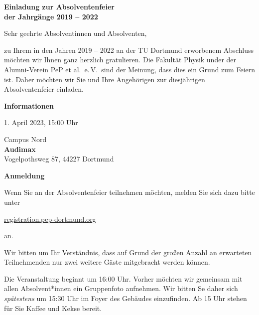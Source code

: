 \documentclass[parskip=half, fontsize=10pt, paper=a5]{scrartcl}
\begin{document}
\raggedright


\begin{center}
\textbf{\Large Einladung zur Absolventenfeier\\ der Jahrgänge 2019 – 2022}
\end{center}
\vspace{0.5cm}

Sehr geehrte Absolventinnen und Absolventen,

zu Ihrem in den Jahren 2019 – 2022 an der TU Dortmund erworbenem Abschluss möchten
wir Ihnen ganz herzlich gratulieren.
Die Fakultät Physik under der Alumni-Verein PeP et al.\ e.\,V.\ sind der Meinung, dass dies ein Grund zum Feiern ist.
Daher möchten wir Sie und Ihre Angehörigen zur diesjährigen Absolventenfeier einladen.

\vspace{0.25cm}
\textcolor{tu}{\textbf{\large Informationen}}
\begin{description}[style=multiline, leftmargin=5em]
  \item[Wann] 1. April 2023, 15:00 Uhr
  \item[Wo] Campus Nord\\
    \textbf{Audimax}\\
    Vogelpothsweg 87, 44227 Dortmund
\end{description}

\vspace{0.25cm}
\textcolor{tu}{\textbf{\large Anmeldung}}

Wenn Sie an der Absolventenfeier teilnehmen möchten, melden Sie sich dazu bitte unter
\begin{center}
  \large
  \href{https://registration.pep-dortmund.org/events/absol23/registration}{registration.pep-dortmund.org} 
\end{center}
an.

Wir bitten um Ihr Verständnis, dass auf Grund der großen Anzahl an erwarteten Teilnehmenden nur zwei weitere
Gäste mitgebracht werden können.

Die Veranstaltung beginnt um 16:00 Uhr. Vorher möchten wir gemeinsam mit allen Absolvent*innen ein Gruppenfoto aufnehmen.
Wir bitten Se daher sich \emph{spätestens} um 15:30 Uhr im Foyer des Gebäudes einzufinden.
Ab 15 Uhr stehen für Sie Kaffee und Kekse bereit.
\end{document}
